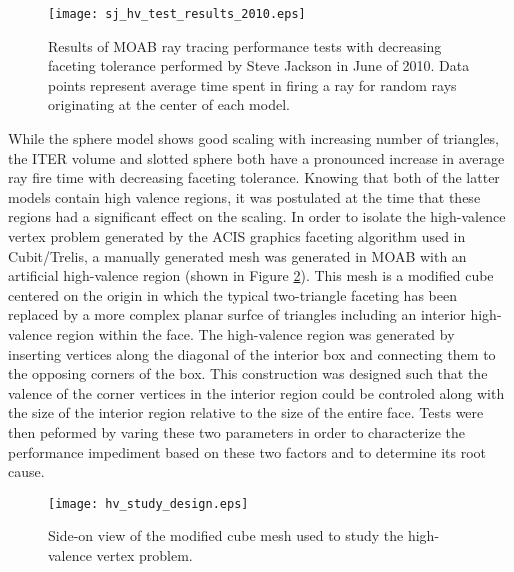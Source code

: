 \begin{figure}[H]
  \begin{center}
    \texttt{[image: sj\_hv\_test\_results\_2010.eps]} \\
    \caption{Results of MOAB ray tracing performance tests with decreasing
      faceting tolerance performed by Steve Jackson in June of 2010. Data points
      represent average time spent in firing a ray for random rays
      originating at the center of each model.}
    \label{fig:sj_hv_test_results}
  \end{center}
\end{figure}

While the sphere model shows good scaling with increasing number of triangles,
the ITER volume and slotted sphere both have a pronounced increase in average
ray fire time with decreasing faceting tolerance. Knowing that both of the
latter models contain high valence regions, it was postulated at the time that
these regions had a significant effect on the scaling. In order to isolate the
high-valence vertex problem generated by the ACIS graphics faceting algorithm
used in Cubit/Trelis, a manually generated mesh was generated in MOAB with an
artificial high-valence region (shown in Figure \ref{hv_cube_design}). This mesh
is a modified cube centered on the origin in which the typical two-triangle
faceting has been replaced by a more complex planar surfce of triangles
including an interior high-valence region within the face. The high-valence
region was generated by inserting vertices along the diagonal of the interior
box and connecting them to the opposing corners of the box. This construction
was designed such that the valence of the corner vertices in the interior region
could be controled along with the size of the interior region relative to the
size of the entire face. Tests were then peformed by varing these two parameters
in order to characterize the performance impediment based on these two factors
and to determine its root cause.

\begin{figure}[H]
  \centering
    \texttt{[image: hv\_study\_design.eps]}
    \caption{Side-on view of the modified cube mesh used to study the high-valence vertex problem.}
    \label{hv_cube_design}
\end{figure}
